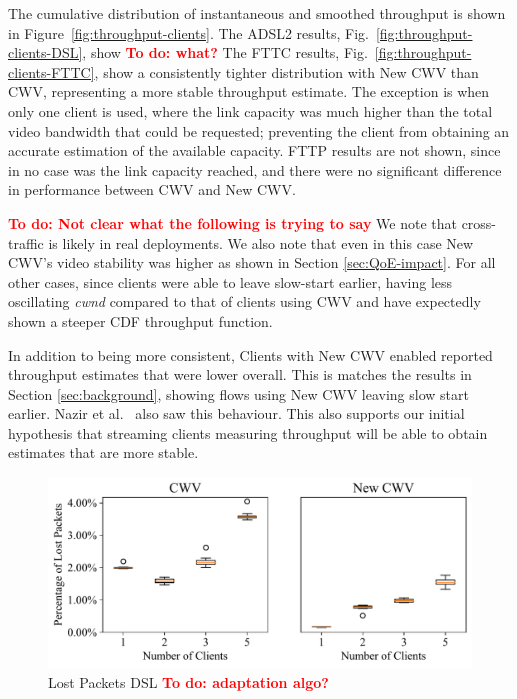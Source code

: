 \documentclass[10pt,sigconf]{acmart}
\newcommand{\todo}[1]{\textbf{\textcolor{red}{To do: #1}}}
\begin{document}
The cumulative distribution of instantaneous and smoothed throughput is shown in 
Figure~\ref{fig:throughput-clients}. 
%
The ADSL2 results, Fig.\ \ref{fig:throughput-clients-DSL}, show \todo{what?}
%
The FTTC results, Fig.\ \ref{fig:throughput-clients-FTTC}, show a consistently tighter distribution with New CWV than CWV, representing a more stable throughput estimate. The exception is when only one client is used, where the link capacity was much higher than the total video bandwidth that could be requested; preventing the client from obtaining an accurate estimation of the available capacity.
%
FTTP results are not shown, since in no case was the link capacity reached, and there were no significant difference in performance between CWV and New CWV.

\todo{Not clear what the following is trying to say}
We note that cross-traffic is likely in real deployments. We also note that even in this case New CWV's video stability was higher as shown in Section \ref{sec:QoE-impact}. For all other cases, since clients were able to leave slow-start earlier, having less oscillating \emph{cwnd} compared to that of clients using CWV and have expectedly shown a steeper CDF throughput function. 

In addition to being more consistent, 
Clients with New CWV enabled reported throughput estimates that were lower overall.
This is matches the results in Section \ref{sec:background}, showing flows using New CWV leaving slow start earlier.
Nazir et al.~\cite{Nazir-2014-performance-evaluation-congestion-window-validation-dash-newcwv} also saw this behaviour. This also supports our initial hypothesis that streaming clients measuring throughput will be able to obtain estimates that are more stable. 

\begin{figure}[t!]
  \centering
  \includegraphics[width=.45\textwidth]{figures/lost_packets.pdf}
  \caption{Lost Packets DSL \todo{adaptation algo?}}
  \label{fig:lost-packets}
\end{figure}
\end{document}
